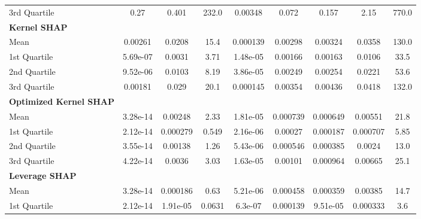 {\begin{tabular} {lcccccccc}
\hspace{7pt}3rd Quartile & 0.27 & 0.401 & 232.0 & 0.00348 & 0.072 & 0.157 & 2.15 & 770.0 \\ 
\addlinespace[1ex] 
\textbf{Kernel SHAP} &  &  &  &  &  &  &  &  \\ 
\hspace{7pt}Mean & 0.00261 & 0.0208 & 15.4 & 0.000139 & 0.00298 & 0.00324 & 0.0358 & 130.0 \\ 
\hspace{7pt}1st Quartile & 5.69e-07 & 0.0031 & 3.71 & 1.48e-05 & 0.00166 & 0.00163 & 0.0106 & 33.5 \\ 
\hspace{7pt}2nd Quartile & 9.52e-06 & 0.0103 & 8.19 & 3.86e-05 & 0.00249 & 0.00254 & 0.0221 & 53.6 \\ 
\hspace{7pt}3rd Quartile & 0.00181 & 0.029 & 20.1 & 0.000145 & 0.00354 & 0.00436 & 0.0418 & 132.0 \\ 
\addlinespace[1ex] 
\textbf{Optimized Kernel SHAP} &  &  &  &  &  &  &  &  \\ 
\hspace{7pt}Mean & \cellcolor{silver!60}3.28e-14 & 0.00248 & 2.33 & 1.81e-05 & 0.000739 & 0.000649 & 0.00551 & \cellcolor{bronze!60}21.8 \\ 
\hspace{7pt}1st Quartile & \cellcolor{bronze!60}2.12e-14 & 0.000279 & 0.549 & 2.16e-06 & 0.00027 & 0.000187 & 0.000707 & 5.85 \\ 
\hspace{7pt}2nd Quartile & \cellcolor{silver!60}3.55e-14 & 0.00138 & 1.26 & 5.43e-06 & 0.000546 & \cellcolor{bronze!60}0.000385 & 0.0024 & \cellcolor{bronze!60}13.0 \\ 
\hspace{7pt}3rd Quartile & \cellcolor{silver!60}4.22e-14 & 0.0036 & 3.03 & 1.63e-05 & 0.00101 & \cellcolor{bronze!60}0.000964 & 0.00665 & 25.1 \\ 
\addlinespace[1ex] 
\textbf{Leverage SHAP} &  &  &  &  &  &  &  &  \\ 
\hspace{7pt}Mean & \cellcolor{bronze!60}3.28e-14 & \cellcolor{gold!60}0.000186 & \cellcolor{gold!60}0.63 & \cellcolor{gold!60}5.21e-06 & \cellcolor{silver!60}0.000458 & \cellcolor{gold!60}0.000359 & \cellcolor{silver!60}0.00385 & \cellcolor{silver!60}14.7 \\ 
\hspace{7pt}1st Quartile & \cellcolor{silver!60}2.12e-14 & \cellcolor{gold!60}1.91e-05 & \cellcolor{gold!60}0.0631 & \cellcolor{gold!60}6.3e-07 & \cellcolor{bronze!60}0.000139 & \cellcolor{silver!60}9.51e-05 & \cellcolor{silver!60}0.000333 & \cellcolor{silver!60}3.6 \\ 

\end{tabular}}
